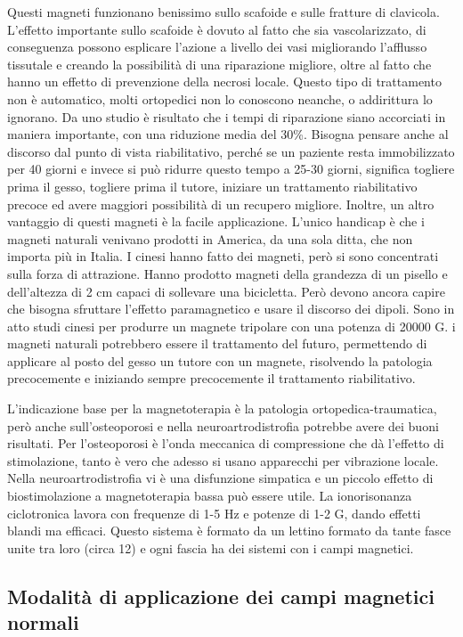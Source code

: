 Questi magneti funzionano benissimo sullo scafoide e sulle fratture di
clavicola. L'effetto importante sullo scafoide è dovuto al fatto che sia
vascolarizzato, di conseguenza possono esplicare l'azione a livello dei
vasi migliorando l'afflusso tissutale e creando la possibilità di una
riparazione migliore, oltre al fatto che hanno un effetto di prevenzione
della necrosi locale. Questo tipo di trattamento non è automatico, molti
ortopedici non lo conoscono neanche, o addirittura lo ignorano. Da uno
studio è risultato che i tempi di riparazione siano accorciati in
maniera importante, con una riduzione media del 30\%. Bisogna pensare
anche al discorso dal punto di vista riabilitativo, perché se un
paziente resta immobilizzato per 40 giorni e invece si può ridurre
questo tempo a 25-30 giorni, significa togliere prima il gesso, togliere
prima il tutore, iniziare un trattamento riabilitativo precoce ed avere
maggiori possibilità di un recupero migliore. Inoltre, un altro
vantaggio di questi magneti è la facile applicazione. L'unico handicap è
che i magneti naturali venivano prodotti in America, da una sola ditta,
che non importa più in Italia. I cinesi hanno fatto dei magneti, però si
sono concentrati sulla forza di attrazione. Hanno prodotto magneti della
grandezza di un pisello e dell'altezza di 2 cm capaci di sollevare una
bicicletta. Però devono ancora capire che bisogna sfruttare l'effetto
paramagnetico e usare il discorso dei dipoli. Sono in atto studi cinesi
per produrre un magnete tripolare con una potenza di 20000 G. i magneti
naturali potrebbero essere il trattamento del futuro, permettendo di
applicare al posto del gesso un tutore con un magnete, risolvendo la
patologia precocemente e iniziando sempre precocemente il trattamento
riabilitativo.

L'indicazione base per la magnetoterapia è la patologia
ortopedica-traumatica, però anche sull'osteoporosi e nella
neuroartrodistrofia potrebbe avere dei buoni risultati. Per
l'osteoporosi è l'onda meccanica di compressione che dà l'effetto di
stimolazione, tanto è vero che adesso si usano apparecchi per vibrazione
locale. Nella neuroartrodistrofia vi è una disfunzione simpatica e un
piccolo effetto di biostimolazione a magnetoterapia bassa può essere
utile. La ionorisonanza ciclotronica lavora con frequenze di 1-5 Hz e
potenze di 1-2 G, dando effetti blandi ma efficaci. Questo sistema è
formato da un lettino formato da tante fasce unite tra loro (circa 12) e
ogni fascia ha dei sistemi con i campi magnetici.

\subsection{Modalità di applicazione dei campi magnetici normali}

